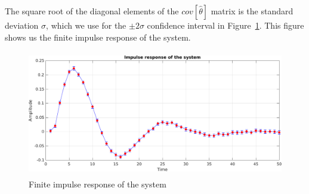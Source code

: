 \documentclass{scrartcl}
\newcommand*{\matlabcode}[3]{\begin{figure}[h!]\end{figure}}
\begin{document}
The square root of the diagonal elements of the $cov[\hat{\theta}]$ matrix is the standard deviation $ \sigma $, which we use for the $ \pm 2 \sigma $ confidence interval in Figure~\ref{fig:fir_response}. This figure shows us the finite impulse response of the system.

\begin{figure}[h]
	\centering
	\includegraphics[height=5.5cm]{figures/fir_response.pdf}
	\caption{Finite impulse response of the system}\label{fig:fir_response}
\end{figure}

\matlabcode{../matlab/ce2/FIR_model_identification.m}{Computing the finite impulse response of the system}{lst:FIR}
\end{document}
